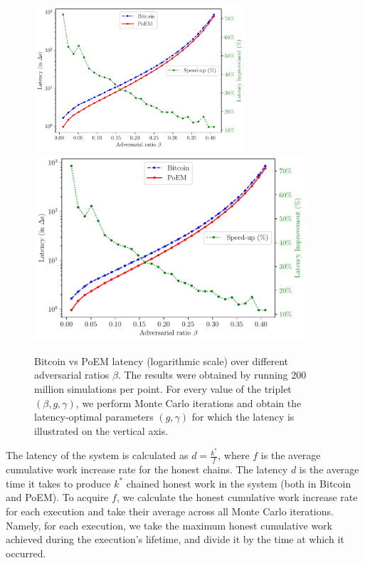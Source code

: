 \begin{figure}[h]
    \centering
    \ifusenix
        \includegraphics[width = 0.7\textwidth]{figures/bitcoin_vs_poem.pdf}
    \else
        \includegraphics[width = 0.9\textwidth]{figures/bitcoin_vs_poem.pdf}
    \fi

    \caption{Bitcoin vs PoEM latency (logarithmic scale) over different adversarial ratios $\beta$.
             The results were obtained by running 200 million simulations per point.
             For every value of the triplet $(\beta, g, \gamma)$, we perform
             \montecarlo{} Monte Carlo iterations and obtain the latency-optimal parameters
             $(g, \gamma)$ for which the latency is illustrated on the vertical axis.}
    \label{fig:bitcoin_vs_poem}
\end{figure}

The latency of the system is calculated as $d = \frac{k^*}{f}$, where $f$ is the average cumulative work increase rate for the honest chains.
The latency $d$ is the average time it takes to produce $k^*$ chained honest work in the system (both in Bitcoin and PoEM).
To acquire $f$, we calculate the honest cumulative work increase rate for each execution and take their average across all Monte Carlo iterations.
Namely, for each execution, we take the maximum honest cumulative work achieved during the execution's lifetime, and divide it by the time
at which it occurred.

